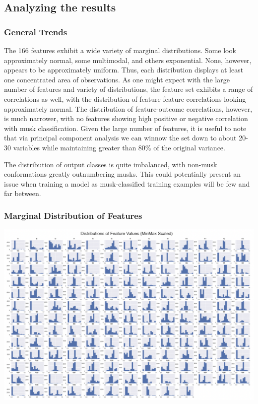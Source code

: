 \documentclass[12pt]{article}
\begin{document}
\subsection{Analyzing the results}

\subsubsection{General Trends}

The 166 features exhibit a wide variety of marginal distributions. Some look approximately normal, some multimodal, and others exponential. None, however, appears to be approximately uniform. Thus, each distribution displays at least one concentrated area of observations. As one might expect with the large number of features and variety of distributions, the feature set exhibits a range of correlations as well, with the distribution of feature-feature correlations looking approximately normal. The distribution of feature-outcome correlations, however, is much narrower, with no features showing high positive or negative correlation with musk classification. Given the large number of features, it is useful to note that via principal component analysis we can winnow the set down to about 20-30 variables while maintaining greater than 80\% of the original variance.

The distribution of output classes is quite imbalanced, with non-musk conformations greatly outnumbering musks. This could potentially present an issue when training a model as musk-classified training examples will be few and far between.

\subsubsection{Marginal Distribution of Features}

\begin{center}
\includegraphics[scale=.35]{feature_distribs.jpg}
\end{center}
\end{document}
